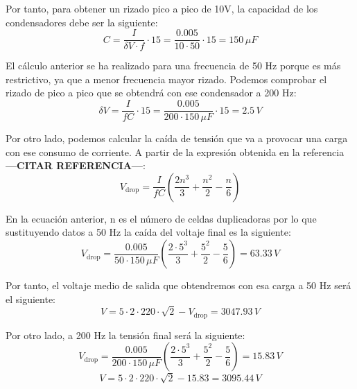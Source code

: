 Por tanto, para obtener un rizado pico a pico de 10V, la capacidad de los condensadores debe 
ser la siguiente:
\begin{equation}
    C = \frac{I}{\delta V\cdot f}\cdot15 = \frac{0.005}{10\cdot 50}\cdot 15 = 150\,\mu F
\end{equation}

El cálculo anterior se ha realizado para una frecuencia de 50 Hz porque es más restrictivo, 
ya que a menor frecuencia mayor rizado. Podemos comprobar el rizado de pico a pico que se obtendrá con ese condensador 
a 200 Hz:
\begin{equation}
    \delta V = \frac{I}{fC}\cdot15 = \frac{0.005}{200\cdot 150\,\mu F}\cdot15 = 2.5\,V
\end{equation}

Por otro lado, podemos calcular la caída de tensión que va a provocar una carga con ese 
consumo de corriente. A partir de la expresión obtenida en la referencia \textbf{---CITAR REFERENCIA---}:
\begin{equation}
    V_{\text{drop}} = \frac{I}{fC}\left(\frac{2n^3}{3}+\frac{n^2}{2}-\frac{n}{6}\right)
\end{equation}

En la ecuación anterior, n es el número de celdas duplicadoras por lo que sustituyendo datos a 50 Hz 
la caída del voltaje final es la siguiente:
\begin{equation}
    V_{\text{drop}} = \frac{0.005}{50\cdot 150\,\mu F}\left(\frac{2\cdot5^3}{3}+\frac{5^2}{2}-\frac{5}{6}\right) = 63.33\,V
\end{equation}

Por tanto, el voltaje medio de salida que obtendremos con esa carga a 50 Hz será el siguiente:
\begin{equation}
    V = 5\cdot2\cdot220\cdot\sqrt{2}-V_{\text{drop}} = 3047.93\,V
\end{equation}

Por otro lado, a 200 Hz la tensión final será la siguiente:
\begin{equation}
    V_{\text{drop}} = \frac{0.005}{200\cdot 150\,\mu F}\left(\frac{2\cdot5^3}{3}+\frac{5^2}{2}-\frac{5}{6}\right) = 15.83\,V
\end{equation}
\begin{equation}
    V = 5\cdot2\cdot220\cdot\sqrt{2}-15.83= 3095.44\,V
\end{equation}